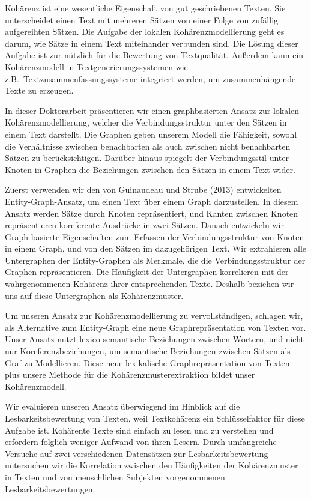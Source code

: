 \addchap*{\abstractname}

Kohärenz ist eine wesentliche Eigenschaft von gut geschriebenen Texten. 
Sie unterscheidet einen Text mit mehreren Sätzen von einer Folge von zufällig aufgereihten Sätzen. 
Die Aufgabe der lokalen Kohärenzmodellierung geht es darum, wie Sätze in einem Text miteinander verbunden sind. 
Die Lösung dieser Aufgabe ist  zur nützlich für die Bewertung von Textqualität. 
Außerdem kann ein Kohärenzmodell in Textgenerierungssystemen wie z.B.\ Textzusammenfassungssysteme integriert werden, um zusammenhängende Texte zu erzeugen. 

In dieser Doktorarbeit präsentieren wir einen graphbasierten Ansatz zur lokalen Kohärenzmodellierung, welcher die Verbindungsstruktur unter den Sätzen in einem Text darstellt. 
Die Graphen geben unserem Modell die Fähigkeit, sowohl die Verhältnisse zwischen benachbarten als auch zwischen nicht benachbarten Sätzen zu berücksichtigen. 
Darüber hinaus spiegelt der Verbindungsstil unter Knoten in Graphen die Beziehungen zwischen den Sätzen in einem Text wider. 

Zuerst verwenden wir den von Guinaudeau und Strube (2013) entwickelten Entity-Graph-Ansatz, um einen Text über einem Graph darzustellen. 
In diesem Ansatz werden Sätze durch Knoten repräsentiert, und Kanten zwischen Knoten repräsentieren koreferente Ausdrücke in zwei Sätzen. 
Danach entwickeln wir Graph-basierte Eigenschaften zum Erfassen der Verbindungsstruktur von Knoten in einem Graph, und von den Sätzen im dazugehörigen Text. 
Wir extrahieren alle Untergraphen der Entity-Graphen als Merkmale, die die Verbindungsstruktur der Graphen repräsentieren.  
Die Häufigkeit der Untergraphen korrelieren mit der wahrgenommenen Kohärenz ihrer entsprechenden Texte. Deshalb beziehen wir uns auf diese Untergraphen als Kohärenzmuster. 

Um unseren Ansatz zur Kohärenzmodellierung zu vervollständigen, schlagen wir, als Alternative zum Entity-Graph eine neue Graphrepräsentation von Texten vor. 
Unser Ansatz nutzt lexico-semantische Beziehungen zwischen Wörtern, und nicht nur Koreferenzbeziehungen, um semantische Beziehungen zwischen Sätzen als Graf zu Modellieren.  
Diese neue lexikalische Graphrepräsentation von Texten plus unsere Methode für die Kohärenzmusterextraktion bildet unser Kohärenzmodell. 

Wir evaluieren unseren Ansatz überwiegend im Hinblick auf die Lesbarkeitsbewertung von Texten, weil Textkohärenz ein Schlüsselfaktor für diese Aufgabe ist. 
Kohärente Texte sind einfach zu lesen und zu verstehen und erfordern folglich weniger Aufwand von ihren Lesern. 
Durch umfangreiche Versuche auf zwei verschiedenen Datensätzen zur Lesbarkeitsbewertung untersuchen wir die Korrelation  zwischen den Häufigkeiten der Kohärenzmuster in Texten und von menschlichen Subjekten vorgenommenen Lesbarkeitsbewertungen.
 
